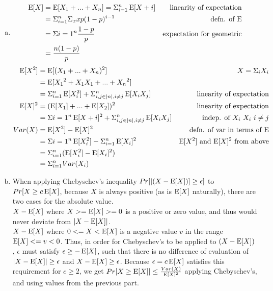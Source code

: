 \documentclass[11pt]{article}
\begin{document}



\begin{enumerate}[(a)]
\item
\begin{solution}
    \begin{align*}
        \operatorname{E}[X] &= \operatorname{E}[X_1 + ... + X_n] = \Sigma_{i=1}^n \operatorname{E}[X+i] & \text{linearity of expectation} \\
             &= \Sigma_{i=1}^n \Sigma_x xp(1-p)^{i-1} & \text{defn. of E} \\
             &= \Sigma{i=1}^n \frac{1-p}{p} & \text{expectation for geometric} \\
             &= \frac{n(1-p)}{p} & \\
    \end{align*}
    \begin{align*}
        \operatorname{E}[X^2] &= \operatorname{E}[(X_1 + ... + X_n)^2] & X = \Sigma_{i} X_i \\
               &= \operatorname{E}[{X_1}^2 + X_1X_1 + ... + {X_n}^2] & \\
               &= \Sigma_{i=1}^n \operatorname{E}[X_{i}^2] + \Sigma_{i,j \in |n|, i \neq j}^n \operatorname{E}[X_i X_j] & \text{linearity of expectation} \\
        \operatorname{E}[X]^2 &= (\operatorname{E}[X_1] + ... + \operatorname{E}[X_2])^2 & \text{linearity of expectation} \\
               &= \Sigma{i=1}^n \operatorname{E}[X+i]^2 +\Sigma_{i,j \in |n|, i \neq j}^n \operatorname{E}[X_i X_j] & \text{indep. of $X_i$ $X_i$ $i \neq j$} \\
        Var(X) &= \operatorname{E}[X^2]- \operatorname{E}[X]^2 & \text{defn. of var in terms of E} \\
               &= \Sigma{i=1}^n \operatorname{E}[X_i^2] - \Sigma_{i=1}^n \operatorname{E}[X_i]^2 & \text{$\operatorname{E}[X^2]$ and $\operatorname{E}[X]^2$ from above} \\
               &= \Sigma_{i=1}^n (\operatorname{E}[X_i^2] - \operatorname{E}[X_i]^2) & \\
               &= \Sigma_{i=1}^n Var(X_i) & \\
    \end{align*}
\end{solution}

\item
\begin{solution}
    When applying Chebyschev's inequality $Pr[|(X - \operatorname{E}[X])] \geq \epsilon]$ to $Pr[X \geq c\operatorname{E}[X]$, because $X$ is always positive (as is $\operatorname{E}[X]$ naturally), there are two cases for the absolute value. \\
    $X - \operatorname{E}[X]$ where $X >= \operatorname{E}[X] >= 0$ is a positive or zero value, and thus would never deviate from $|X - \operatorname{E}[X]|$. \\
    $X - \operatorname{E}[X]$ where $0 <= X < \operatorname{E}[X]$ is a negative value $v$ in the range $\operatorname{E}[X] <= v < 0$. Thus, in order for Chebyschev's to be applied to $(X - \operatorname{E}[X])$, $\epsilon$ must satisfy $\epsilon \geq -\operatorname{E}[X]$, such that there is no difference of evaluation of $|X - \operatorname{E}[X]| \geq \epsilon$ and $X - \operatorname{E}[X] \geq \epsilon$. Because $\epsilon = c\operatorname{E}[X]$ satisfies this requirement for $c \geq 2$, we get $Pr[X \geq \operatorname{E}[X]] \leq \frac{Var(X)}{\operatorname{E}[X]^2}$ applying Chebyschev's, and using values from the previous part.
\end{solution}


\end{enumerate}
\end{document}
